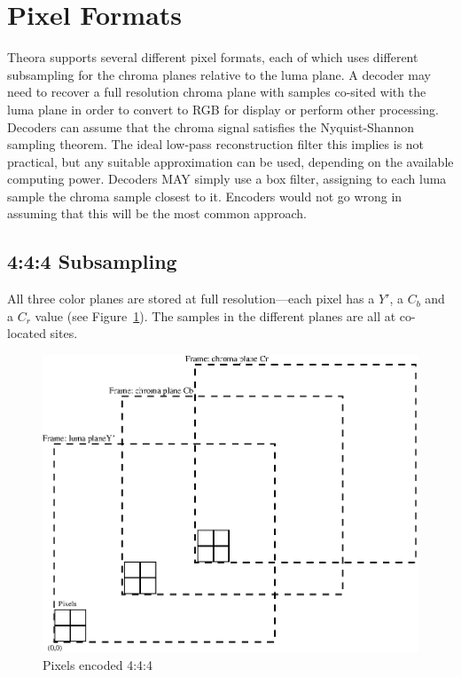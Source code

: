 \documentclass[9pt,letterpaper]{book}
\numberwithin{equation}{chapter}
\numberwithin{figure}{chapter}
\numberwithin{table}{chapter}
\begin{document}
\section{Pixel Formats}
\label{sec:pixfmts}

Theora supports several different pixel formats, each of which uses different
 subsampling for the chroma planes relative to the luma plane.
A decoder may need to recover a full resolution chroma plane with samples
 co-sited with the luma plane in order to convert to RGB for display or perform
 other processing.
Decoders can assume that the chroma signal satisfies the Nyquist-Shannon
 sampling theorem.
The ideal low-pass reconstruction filter this implies is not practical, but any
 suitable approximation can be used, depending on the available computing
 power.
Decoders MAY simply use a box filter, assigning to each luma sample the chroma
 sample closest to it.
Encoders would not go wrong in assuming that this will be the most common
 approach.

\subsection{4:4:4 Subsampling}
\label{sec:444}

All three color planes are stored at full resolution---each pixel has a $Y'$,
 a $C_b$ and a $C_r$ value (see Figure~\ref{fig:pixel444}).
The samples in the different planes are all at co-located sites.

\begin{figure}[htbp]
\begin{center}
\includegraphics{pixel444}
\end{center}
\caption{Pixels encoded 4:4:4}
\label{fig:pixel444}
\end{figure}
\end{document}
